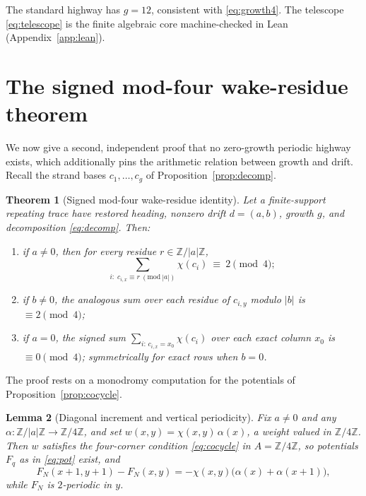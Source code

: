 \documentclass[11pt,letterpaper]{article}
\theoremstyle{plain}
\newtheorem{theorem}{Theorem}[section]
\newtheorem{lemma}[theorem]{Lemma}
\theoremstyle{definition}
\newcommand{\Z}{\mathbb{Z}}
\newcommand{\che}{\chi}
\newcommand{\drift}{d}
\newcommand{\growth}{g}
\begin{document}
\begin{NoHyper}
The standard highway has $\growth=12$, consistent with \eqref{eq:growth4}. The
telescope \eqref{eq:telescope} is the finite algebraic core machine-checked in Lean
(Appendix~\ref{app:lean}).

\section{The signed mod-four wake-residue theorem}\label{sec:residue}

We now give a second, independent proof that no zero-growth periodic highway exists,
which additionally pins the arithmetic relation between growth and drift. Recall the
strand bases $c_1,\dots,c_\growth$ of Proposition~\ref{prop:decomp}.

\begin{theorem}[Signed mod-four wake-residue identity]\label{thm:residue}
Let a finite-support repeating trace have restored heading, nonzero drift
$\drift=(a,b)$, growth $\growth$, and decomposition \eqref{eq:decomp}. Then:
\begin{enumerate}[label=\textup{(\roman*)}]
\item if $a\neq0$, then for every residue $r\in\Z/|a|\Z$,
\begin{equation}\label{eq:res-a}
\sum_{i:\;c_{i,x}\equiv r\ (\mathrm{mod}\ |a|)}\che(c_i)\ \equiv\ 2\pmod4;
\end{equation}
\item if $b\neq0$, the analogous sum over each residue of $c_{i,y}$ modulo $|b|$ is
$\equiv2\pmod4$;
\item if $a=0$, the signed sum $\sum_{i:\,c_{i,x}=x_0}\che(c_i)$ over each exact
column $x_0$ is $\equiv0\pmod4$; symmetrically for exact rows when $b=0$.
\end{enumerate}
\end{theorem}

The proof rests on a monodromy computation for the potentials of
Proposition~\ref{prop:cocycle}.

\begin{lemma}[Diagonal increment and vertical periodicity]\label{lem:diag}
Fix $a\neq0$ and any $\alpha:\Z/|a|\Z\to\Z/4\Z$, and set $w(x,y)=\che(x,y)\,\alpha(x)$,
a weight valued in $\Z/4\Z$. Then $w$ satisfies the four-corner condition
\eqref{eq:cocycle} in $A=\Z/4\Z$, so potentials $F_q$ as in
\eqref{eq:pot} exist, and
\begin{equation}\label{eq:diag}
F_N(x{+}1,y{+}1)-F_N(x,y)=-\che(x,y)\bigl(\alpha(x)+\alpha(x{+}1)\bigr),
\end{equation}
while $F_N$ is $2$-periodic in $y$.
\end{lemma}


\end{NoHyper}
\end{document}
